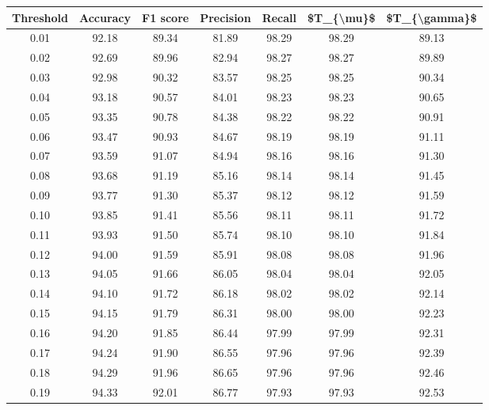 \begin{tabular}{|c|c|c|c|c|c|c|}
\hline
 Threshold &  Accuracy &  F1 score &  Precision &  Recall &  \$T\_\{\textbackslash mu\}\$ &  \$T\_\{\textbackslash gamma\}\$ \\
\hline
      0.01 &     92.18 &     89.34 &      81.89 &   98.29 &      98.29 &         89.13 \\
      0.02 &     92.69 &     89.96 &      82.94 &   98.27 &      98.27 &         89.89 \\
      0.03 &     92.98 &     90.32 &      83.57 &   98.25 &      98.25 &         90.34 \\
      0.04 &     93.18 &     90.57 &      84.01 &   98.23 &      98.23 &         90.65 \\
      0.05 &     93.35 &     90.78 &      84.38 &   98.22 &      98.22 &         90.91 \\
      0.06 &     93.47 &     90.93 &      84.67 &   98.19 &      98.19 &         91.11 \\
      0.07 &     93.59 &     91.07 &      84.94 &   98.16 &      98.16 &         91.30 \\
      0.08 &     93.68 &     91.19 &      85.16 &   98.14 &      98.14 &         91.45 \\
      0.09 &     93.77 &     91.30 &      85.37 &   98.12 &      98.12 &         91.59 \\
      0.10 &     93.85 &     91.41 &      85.56 &   98.11 &      98.11 &         91.72 \\
      0.11 &     93.93 &     91.50 &      85.74 &   98.10 &      98.10 &         91.84 \\
      0.12 &     94.00 &     91.59 &      85.91 &   98.08 &      98.08 &         91.96 \\
      0.13 &     94.05 &     91.66 &      86.05 &   98.04 &      98.04 &         92.05 \\
      0.14 &     94.10 &     91.72 &      86.18 &   98.02 &      98.02 &         92.14 \\
      0.15 &     94.15 &     91.79 &      86.31 &   98.00 &      98.00 &         92.23 \\
      0.16 &     94.20 &     91.85 &      86.44 &   97.99 &      97.99 &         92.31 \\
      0.17 &     94.24 &     91.90 &      86.55 &   97.96 &      97.96 &         92.39 \\
      0.18 &     94.29 &     91.96 &      86.65 &   97.96 &      97.96 &         92.46 \\
      0.19 &     94.33 &     92.01 &      86.77 &   97.93 &      97.93 &         92.53 \\

\end{tabular}
